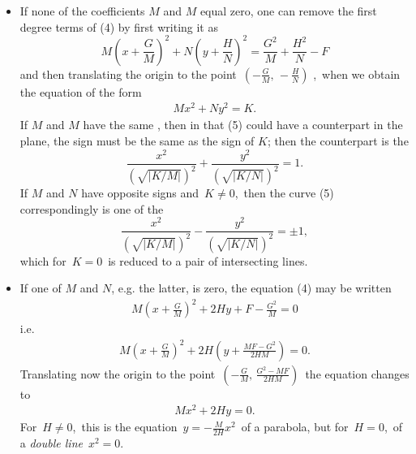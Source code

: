 \documentclass[12pt]{article}
\theoremstyle{definition}
\begin{document}
\begin{itemize}
\item If none of the coefficients $M$ and $M$ equal zero, one can remove the first degree terms of (4) by first writing it as
$$M\left(x+\frac{G}{M}\right)^2+N\left(y+\frac{H}{N}\right)^2 = \frac{G^2}{M}+\frac{H^2}{N}-F$$
and then translating the origin to the point \,$\left(-\frac{G}{M},\,-\frac{H}{N}\right)$ ,\, when we obtain the equation of the form
\begin{align}
Mx^2+Ny^2 = K.
\end{align}
If $M$ and $M$ have the same , then in  that (5) could have a counterpart in the plane, the sign must be the same as the sign of $K$; then the counterpart is the 
$$\frac{x^2}{\left(\sqrt{|K/M|}\right)^2}+\frac{y^2}{\left(\sqrt{|K/N|}\right)^2} = 1.$$
If $M$ and $N$ have opposite signs and\, $K \neq 0$,\, then the curve (5) correspondingly is one of the 
$$\frac{x^2}{\left(\sqrt{|K/M|}\right)^2}-\frac{y^2}{\left(\sqrt{|K/N|}\right)^2} = \pm1,$$
which for\, $K = 0$\, is reduced to a pair of intersecting lines.\\

\item If one of $M$ and $N$, e.g. the latter, is zero, the equation (4) may be written
\begin{align*}
M\left(x+\frac{G}{M}\right)^2+2Hy+F-\frac{G^2}{M} = 0
\end{align*}
i.e.
\begin{align*}
M\left(x+\frac{G}{M}\right)^2+2H\left(y+\frac{MF-G^2}{2HM}\right) = 0.
\end{align*}
Translating now the origin to the point\, $\left(-\frac{G}{M},\,\frac{G^2-MF}{2HM}\right)$\, the equation changes to
\begin{align}
Mx^2+2Hy = 0.
\end{align}
For\, $H \neq 0$,\, this is the equation\, $y = -\frac{M}{2H}x^2$\, of a parabola, but for\, $H = 0$,\, of a {\em double line}\, $x^2 = 0$.\\
\end{itemize}
\end{document}
